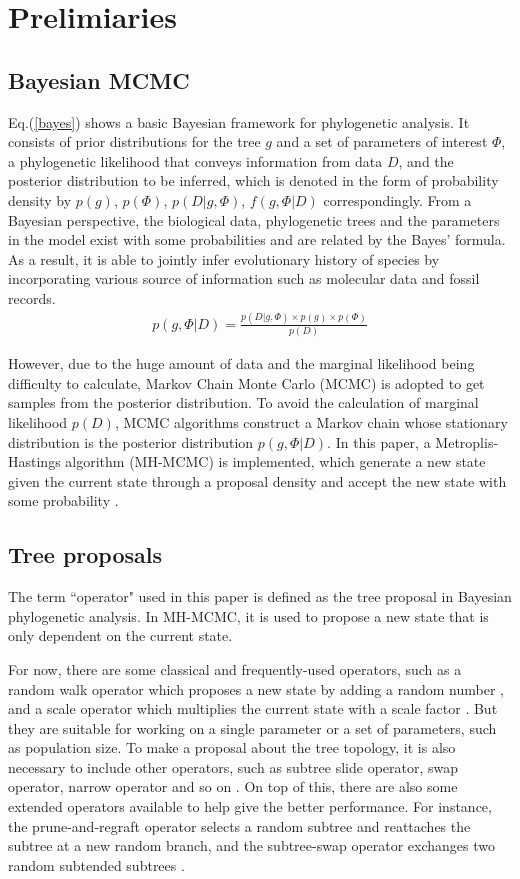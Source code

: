 \documentclass{bmcart}
\begin{document}
\section*{Prelimiaries}
\subsection*{Bayesian MCMC}
Eq.(\ref{bayes}) shows a basic Bayesian framework for phylogenetic analysis. It consists of prior distributions for the tree $g$ and a set of parameters of interest $\Phi $, a phylogenetic likelihood that conveys information from data $D$, and the posterior distribution to be inferred, which is denoted in the form of probability density by $p(g) $, $p(\Phi )$, $p(D|g,\Phi )$, $f(g,\Phi |D)$ correspondingly. From a Bayesian perspective, the biological data, phylogenetic trees and the parameters in the model exist with some probabilities and are related by the Bayes' formula. As a result, it is able to jointly infer evolutionary history of species  by incorporating various source of information such as molecular data and fossil records.
\begin{eqnarray}\label{bayes}
p(g,\Phi |D) = \frac{{p (D|g,\Phi ) \times p (g) \times p (\Phi )}}{{p (D)}}
\end{eqnarray}

However, due to the huge amount of data and the marginal likelihood being difficulty to calculate, Markov Chain Monte Carlo (MCMC) is adopted to get samples from the posterior distribution. To avoid the calculation of marginal likelihood $p (D)$, MCMC algorithms construct a Markov chain whose stationary distribution is the posterior distribution $p(g,\Phi |D)$. In this paper, a Metroplis-Hastings algorithm (MH-MCMC) is implemented, which generate a new state given the current state through a proposal density and accept the new state with some probability \cite{metropolis1953equation,hastings1970monte}.
\subsection*{Tree proposals}
\label{treeproposals}
The term ``operator" used in this paper is defined as the tree proposal in Bayesian phylogenetic analysis. In MH-MCMC, it is used to propose a new state that is only dependent on the current state.

For now, there are some classical and frequently-used operators, such as a random walk operator which proposes a new state by adding a random number \cite{suchard2005stochastic}, and a scale operator which multiplies the current state with a scale factor \cite{higuchi1997monte}. But they are suitable for working on a single parameter or a set of parameters, such as population size. To make a proposal about the tree topology, it is also necessary to include other operators, such as subtree slide operator, swap operator, narrow operator and so on \cite{hohna2008clock}. On top of this, there are also some extended operators available to help give the better performance. For instance, the prune-and-regraft operator selects a random subtree and reattaches the subtree at a new random branch, and the subtree-swap operator exchanges two random subtended subtrees \cite{hohna2011guided}. 
\end{document}
